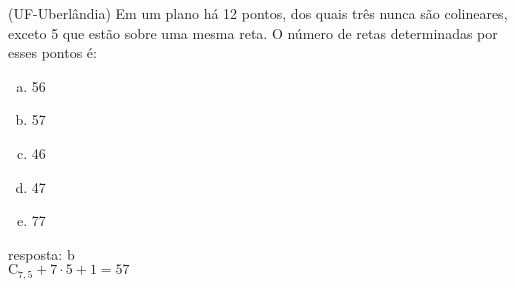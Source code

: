 \begin{ex}
 (UF-Uberlândia) Em um plano há 12 pontos, dos quais três nunca são colineares, exceto 5 que estão sobre uma mesma reta. O número de retas determinadas por esses pontos é:
    \begin{enumerate}[(a)]
    \item 56
    \item 57
    \item 46
    \item 47
    \item 77
    \end{enumerate}
      \begin{sol}
       resposta: b \\
       $\mathrm{C}_{7,5}+7\cdot5+1=57$
      \end{sol}
\end{ex}